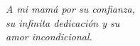\begin{dedication}
\emph{A mi mamá por su confianza, \\su infinita dedicación y su \\amor
incondicional.} 
\end{dedication}
